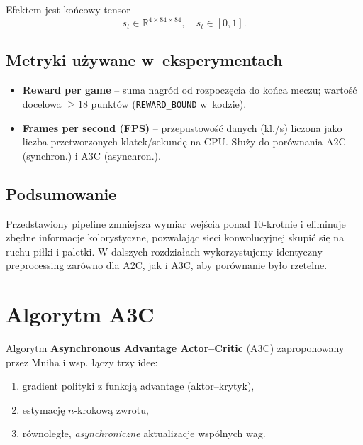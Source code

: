 \documentclass[12pt,a4paper]{article}
\begin{document}
Efektem jest końcowy tensor
\begin{equation}
  s_t \in \mathbb{R}^{4\times84\times84},\quad s_t\in[0,1].
\end{equation}

\subsection{Metryki używane w~eksperymentach}

\begin{itemize}
  \item \textbf{Reward per game} –
        suma nagród od rozpoczęcia do końca meczu;
        wartość docelowa \(\ge 18\) punktów
        (\texttt{REWARD\_BOUND} w~kodzie).
  \item \textbf{Frames per second (FPS)} –
        przepustowość danych (kl./s) liczona jako
        liczba przetworzonych klatek/sekundę na CPU.
        Służy do porównania A2C (synchron.) i A3C (asynchron.).
\end{itemize}

\subsection*{Podsumowanie}

Przedstawiony pipeline zmniejsza wymiar wejścia
ponad 10-krotnie i eliminuje zbędne informacje kolorystyczne,
pozwalając sieci konwolucyjnej skupić się na ruchu piłki i paletki.
W dalszych rozdziałach wykorzystujemy identyczny preprocessing
zarówno dla A2C, jak i A3C, aby porównanie było rzetelne.


\section{Algorytm A3C}
\label{sec:algorithms}

Algorytm \textbf{Asynchronous Advantage Actor–Critic} (A3C)
zaproponowany przez Mniha i wsp. \cite{Mnih2016A3C}
łączy trzy idee:
\begin{enumerate}
  \item gradient polityki z funkcją advantage (aktor–krytyk),
  \item estymację $n$-krokową zwrotu,
  \item równoległe, \emph{asynchroniczne} aktualizacje wspólnych wag.
\end{enumerate}
\end{document}
